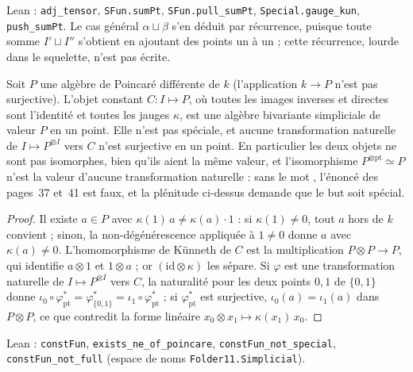 Lean : \texttt{adj\_tensor}, \texttt{SFun.\allowbreak{}sumPt}, \texttt{SFun.\allowbreak{}pull\_sumPt}, \texttt{Special.\allowbreak{}gauge\_kun}, \texttt{push\_sumPt}. Le cas général $\alpha \sqcup \beta$ s'en déduit par récurrence, puisque toute somme $I' \sqcup I''$ s'obtient en ajoutant des points un à un ; cette récurrence, lourde dans le squelette, n'est pas écrite.

\begin{encadre}
\begin{contrexemple}
Soit $P$ une algèbre de Poincaré différente de $k$ (l'application $k \to P$ n'est pas surjective). L'objet constant $C : I \mapsto P$, où toutes les images inverses et directes sont l'identité et toutes les jauges $\kappa$, est une algèbre bivariante simpliciale de valeur $P$ en un point. Elle n'est pas spéciale, et aucune transformation naturelle de $I \mapsto P^{\otimes I}$ vers $C$ n'est surjective en un point. En particulier les deux objets ne sont pas isomorphes, bien qu'ils aient la même valeur, et l'isomorphisme $P^{\otimes \mathrm{pt}} \simeq P$ n'est la valeur d'aucune transformation naturelle : sans le mot , l'énoncé des pages~37 et~41 est faux, et la plénitude ci-dessus demande que le but soit spécial.
\end{contrexemple}
\end{encadre}

\begin{proof}
Il existe $a \in P$ avec $\kappa(1)\,a \neq \kappa(a)\cdot 1$ : si $\kappa(1) \neq 0$, tout $a$ hors de $k$ convient ; sinon, la non-dégénérescence appliquée à $1 \neq 0$ donne $a$ avec $\kappa(a) \neq 0$. L'homomorphisme de Künneth de $C$ est la multiplication $P \otimes P \to P$, qui identifie $a \otimes 1$ et $1 \otimes a$ ; or $(\mathrm{id} \otimes \kappa)$ les sépare. Si $\varphi$ est une transformation naturelle de $I \mapsto P^{\otimes I}$ vers $C$, la naturalité pour les deux points $0, 1$ de $\{0, 1\}$ donne $\iota_0 \circ \varphi^*_{\mathrm{pt}} = \varphi^*_{\{0,1\}} = \iota_1 \circ \varphi^*_{\mathrm{pt}}$ ; si $\varphi^*_{\mathrm{pt}}$ est surjective, $\iota_0(a) = \iota_1(a)$ dans $P \otimes P$, ce que contredit la forme linéaire $x_0 \otimes x_1 \mapsto \kappa(x_1)\,x_0$.
\end{proof}

Lean : \texttt{constFun}, \texttt{exists\_ne\_of\_poincare}, \texttt{constFun\_not\_special}, \texttt{constFun\_not\_full} (espace de noms \texttt{Folder11.\allowbreak{}Simplicial}).

